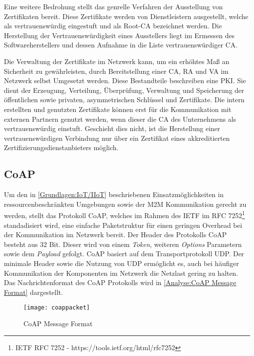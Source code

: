 Eine weitere Bedrohung stellt das genrelle Verfahren der Ausstellung von Zertifikaten bereit. Diese Zertifikate werden von Dienstleistern ausgestellt, welche als vertrauenswürdig eingestuft und als Root-\ac{CA} bezeichnet werden. Die Herstellung der Vertrauenswürdigkeit eines Ausstellers liegt im Ermessen des Softwareherstellers und dessen Aufnahme in die Liste vertrauenswürdiger \ac{CA}. 

Die Verwaltung der Zertifikate im Netzwerk kann, um ein erhöhtes Maß an Sicherheit zu gewährleisten, durch Bereitstellung einer \ac{CA}, \ac{RA} und \ac{VA} im Netzwerk selbst Umgesetzt werden. Diese Bestandteile beschreiben eine \ac{PKI}. Sie dient der Erzeugung, Verteilung, Überprüfung, Verwaltung und Speicherung der öffentlichen sowie privaten, asymmetrischen Schlüssel und Zertifikate. Die intern erstellten und genutzten Zertifikate können erst für die Kommunikation mit externen Partnern genutzt werden, wenn dieser die \ac{CA} des Unternehmens als vertrauenswürdig einstuft. Geschieht dies nicht, ist die Herstellung einer vertrauenswürdigen Verbindung nur über ein Zertifikat eines akkreditierten Zertifizierungsdienstanbieters möglich.

\subsection{\ac{CoAP}}
Um den in \autoref{Grundlagen:IoT/IIoT} beschriebenen Einsatzmöglichkeiten in ressourcenbeschränkten Umgebungen sowie der \ac{M2M} Kommunikation gerecht zu werden, stellt das Protokoll \ac{CoAP}, welches im Rahmen des \ac{IETF} im RFC 7252\footnote{IETF RFC 7252 - https://tools.ietf.org/html/rfc7252} standadisiert wird, eine einfache Paketstruktur für einen geringen Overhead bei der Kommunikation im Netzwerk bereit. Der Header des Protokolls \ac{CoAP} besteht aus 32 Bit. Dieser wird von einem \textit{Token}, weiteren \textit{Options} Parametern sowie dem \textit{Payload} gefolgt. \ac{CoAP} basiert auf dem Transportprotokoll \ac{UDP}. Der minimale Header sowie die Nutzung von \ac{UDP} ermöglicht es, auch bei häufiger Kommunikation der Komponenten im Netzwerk die Netzlast gering zu halten. Das Nachrichtenformat des \ac{CoAP} Protokolls wird in \autoref{Analyse:CoAP Message Format} dargestellt.

\begin{figure}[h]
  \centering
  \texttt{[image: coappacket]}
  \caption{CoAP Message Format} 
  \label{Analyse:CoAP Message Format}
\end{figure}

